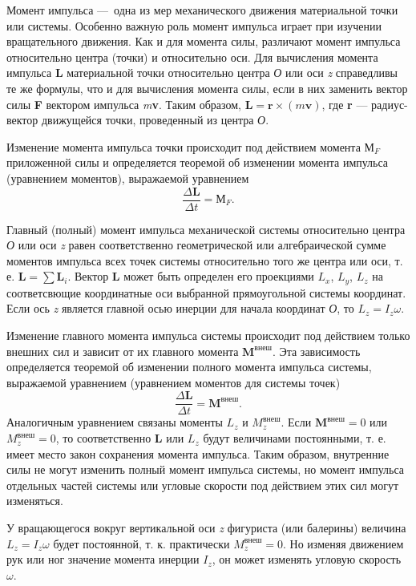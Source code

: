 \documentclass[14pt,a4paper,oneside]{extarticle}	%
\begin{document}
	Момент импульса — одна из мер механического движения материальной точки или системы.
	Особенно важную роль момент импульса играет при изучении вращательного движения.
	Как и для момента силы, различают момент импульса относительно центра (точки) и относительно оси. 
	Для вычисления момента импульса \textbf{L} материальной точки относительно центра \textit{О} или оси \textit{z} справедливы те же формулы, что и для вычисления момента силы, если в них заменить вектор силы \textbf{F} вектором импульса \textit{m}\textbf{v}.
	Таким образом, $\textbf{L} = \textbf{r}\times (m\textbf{v})$, где \textbf{r} — радиус-вектор движущейся точки, проведенный из центра \textit{О}.
	
	Изменение момента импульса точки происходит под действием момента $ \textbf{М}_F $ приложенной силы и определяется теоремой об изменении момента импульса (уравнением моментов), выражаемой уравнением
	$$ \frac{\Delta \textbf{L}}{\Delta t}  = \textbf{М}_F.$$
	
	Главный (полный) момент импульса механической системы относительно центра \textit{О} или оси \textit{z} равен соответственно геометрической или алгебраической сумме моментов импульса всех точек системы относительно того же центра или оси, т. е. $ \textbf{L} = \sum \textbf{L}_i $. 
	Вектор \textbf{L} может быть определен его проекциями $ L_x $, $ L_y $, $ L_z $ на соответсвющие координатные оси выбранной прямоугольной системы координат.
	Если ось \textit{z} является главной осью инерции для начала координат \textit{О}, то $ L_z = I_z\omega $.
	
	Изменение главного момента импульса системы происходит под действием только внешних сил и зависит от их главного момента $ \textbf{M}^\text{внеш} $.
	Эта зависимость определяется теоремой об изменении полного момента импульса системы, выражаемой уравнением (уравнением моментов для системы точек) $$ \frac{\Delta \textbf{L}}{\Delta t} = \textbf{M}^\text{внеш}.$$
	Аналогичным уравнением связаны моменты $ L_z $ и $ M_z^\text{внеш} $.
	Если $ \textbf{M}^\text{внеш}=0 $ или $ M_z^\text{внеш}=0 $, то соответственно \textbf{L} или $ L_z $ будут величинами постоянными, т. е. имеет место закон сохранения момента импульса.
	Таким образом, внутренние силы не могут изменить полный момент импульса системы, но момент импульса отдельных частей системы или угловые скорости под действием этих сил могут изменяться.
	
У вращающегося вокруг вертикальной оси \textit{z} фигуриста (или балерины) величина $ L_z = I_z\omega $ будет постоянной, т. к. практически $ M_z^\text{внеш}=0 $.
	Но изменяя движением рук или ног значение момента инерции $ I_z $, он может изменять угловую скорость $ \omega $.
	
\end{document}
